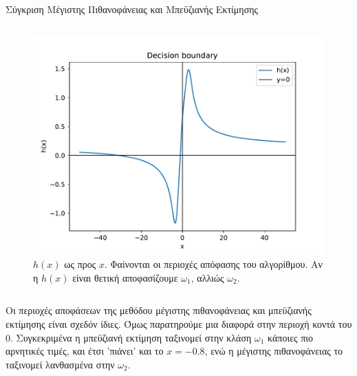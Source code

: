 \documentclass{beamer}
\begin{document}
\begin{frame}{Σύγκριση Μέγιστης Πιθανοφάνειας και Μπεϋζιανής Εκτίμησης}
{\begin{columns}[T]
\begin{columns}[T]
\begin{column}{0.48\textwidth}
    \begin{figure}
        \centering
            \includegraphics[width=\textwidth]{../plots/DB2.pdf}
            \tiny
            \caption{\tiny $h(x)$ ως προς $x$. Φαίνονται οι περιοχές απόφασης του αλγορίθμου. Αν 
            η $h(x)$ είναι θετική αποφασίζουμε $\omega_1$, αλλιώς $\omega_2$.}
            \label{fig:DB2}
    \end{figure}
        
    \end{column}
        
    \end{columns}
    \end{columns}%
    }

    \vfill
    \begin{columns}[T]
        \begin{column}{\textwidth}
            \scriptsize
            Οι περιοχές αποφάσεων της μεθόδου μέγιστης πιθανοφάνειας και μπεϋζιανής εκτίμησης είναι σχεδόν ίδιες. Όμως 
            παρατηρούμε μια διαφορά στην περιοχή κοντά του 0. Συγκεκριμένα η μπεϋζιανή εκτίμηση ταξινομεί στην κλάση 
            $\omega_1$ κάποιες πιο αρνητικές τιμές, και έτσι 'πιάνει' και το $x=-0.8$, ενώ η μέγιστης πιθανοφάνειας το 
            ταξινομεί λανθασμένα στην $\omega_2$.
        \end{column}
    \end{columns}

\end{frame}
\end{document}
